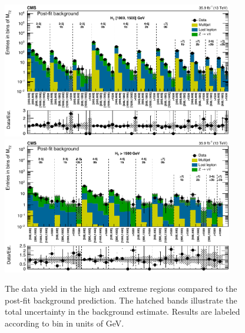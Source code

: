 \begin{figure}
	\centering
	\includegraphics[width=0.90\textwidth]{results/figs/postfit/mt2_highHT_fullEstimate}
	\includegraphics[width=0.90\textwidth]{results/figs/postfit/mt2_extremeHT_fullEstimate}
	\caption{The data yield in the high \HT and extreme \HT regions compared to the post-fit background prediction. The hatched bands illustrate the total uncertainty in the background estimate. Results are labeled according to \mttwo bin in units of GeV.}
	\label{fig:yieldPostfit3}
\end{figure}

